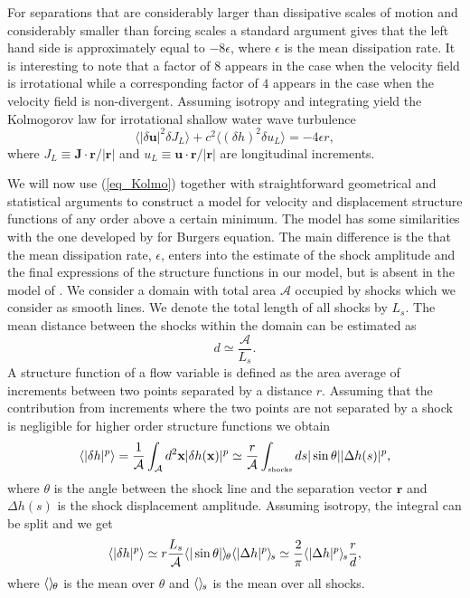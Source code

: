 \documentclass{jfm}
\newcommand{\uu}{\textbf{u}}
\newcommand{\xx}{\textbf{x}}
\newcommand{\JJ}{\textbf{J}}
\newcommand{\rr}{\textbf{r}}
\newcommand{\meane}[1]{\langle #1 \rangle}
\newcommand{\meant}[1]{{\langle #1 \rangle_{\hspace{-0.4mm}\theta}}}
\newcommand{\means}[1]{{\langle #1 \rangle_{\hspace{-0.4mm}s}}}
\newcommand{\shocks}{ {\mbox{\tiny shocks}} }
\newcommand{\mA}{\mathcal{A}}
\begin{document}
For separations that are considerably larger than dissipative scales of motion and considerably smaller than forcing scales a standard argument \cite[see for example][]{Frisch} gives that the left hand side is approximately equal to $ -8 \epsilon $, where $ \epsilon $ is the mean dissipation rate. It is interesting to note that a factor of $ 8 $ appears in the case when the velocity field is irrotational while a corresponding factor of $ 4 $ appears in the case when the velocity field is non-divergent. 
Assuming isotropy and integrating yield the Kolmogorov law for
irrotational shallow water wave  turbulence
\begin{equation}
\meane{ |\delta \uu|^2 \delta J_L } 
+ c^2\meane{ (\delta h)^2 \delta u_L } = -4 \epsilon r, \label{eq_Kolmo}
\end{equation}
where $J_L \equiv
\JJ\cdot\rr / |\rr|$ and $u_L \equiv \uu\cdot\rr / |\rr|$ are
longitudinal increments.




We will now use (\ref{eq_Kolmo}) together with straightforward geometrical and statistical arguments to construct a model for velocity and displacement structure functions of any order above a certain minimum.
The model has some similarities with the one developed by \cite{BouchaudMezardParisi1995} for Burgers equation. The main difference is the that the mean dissipation rate, $\epsilon $, enters into the estimate of the shock amplitude and the final expressions of the structure functions in our model, but is absent in the model of \cite{BouchaudMezardParisi1995}.
We consider a domain with total area  $ {\mA} $ occupied by shocks which we 
consider as smooth lines. We denote the total length of all shocks by $ L_s $.  The mean distance between the shocks within the domain can be estimated as
\begin{equation}
d \simeq \frac{\mA} {L_s} .
\end{equation} 
A structure function of a flow variable is defined as the area average of increments  between two points separated by a distance $ r $.
Assuming that the contribution from increments where the two points are not separated by a shock is negligible for higher order structure functions we obtain
\begin{eqnarray}
\meane{|\delta h|^p} 
=  \frac{1}{\mA} \int_{\mA}  d^2\xx |\delta h(\xx)|^p 
 \simeq  \frac{r}{\mA} \int_\shocks ds |\sin\theta| |\Delta h (s)|^p,
\end{eqnarray}
where $\theta$ is the angle between the shock line and the separation
vector $\rr$ %
and $\Delta h (s)$ is the shock displacement amplitude.
%
Assuming isotropy, the integral can be split and we get
\begin{equation} \label{StepH}
\meane{|\delta h|^p} 
\simeq 
r \frac{L_s}{\mA} \meant{|\sin\theta|} \means{|\Delta h |^p}
\simeq  \frac{2}{\pi} \means{|\Delta h |^p} \frac{r}{d} ,
\end{equation}
where $\meant{}$ is the mean over $\theta$
and $\means{}$ is the mean over all shocks.
\end{document}
